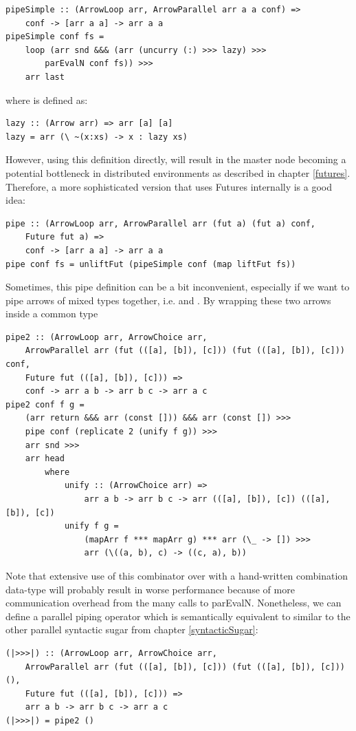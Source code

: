 \begin{lstlisting}[frame=htrbl]
pipeSimple :: (ArrowLoop arr, ArrowParallel arr a a conf) =>
	conf -> [arr a a] -> arr a a
pipeSimple conf fs =
	loop (arr snd &&& (arr (uncurry (:) >>> lazy) >>>
		parEvalN conf fs)) >>>
	arr last
\end{lstlisting}
where  is defined as:
\begin{lstlisting}[frame=htrbl]
lazy :: (Arrow arr) => arr [a] [a]
lazy = arr (\ ~(x:xs) -> x : lazy xs)
\end{lstlisting}
However, using this definition directly, will result in the master node becoming a potential bottleneck in distributed environments as described in chapter \ref{futures}. Therefore, a more sophisticated version that uses Futures internally is a good idea:
\begin{lstlisting}[frame=htrbl]
pipe :: (ArrowLoop arr, ArrowParallel arr (fut a) (fut a) conf,
	Future fut a) =>
	conf -> [arr a a] -> arr a a
pipe conf fs = unliftFut (pipeSimple conf (map liftFut fs))
\end{lstlisting}
Sometimes, this pipe definition can be a bit inconvenient, especially if we want to pipe arrows of mixed types together, i.e.  and . By wrapping these two arrows inside a common type
\begin{lstlisting}[frame=htrbl]
pipe2 :: (ArrowLoop arr, ArrowChoice arr,
	ArrowParallel arr (fut (([a], [b]), [c])) (fut (([a], [b]), [c])) conf,
	Future fut (([a], [b]), [c])) =>
	conf -> arr a b -> arr b c -> arr a c
pipe2 conf f g = 
	(arr return &&& arr (const [])) &&& arr (const []) >>>
	pipe conf (replicate 2 (unify f g)) >>>
	arr snd >>>
	arr head
		where
			unify :: (ArrowChoice arr) =>
				arr a b -> arr b c -> arr (([a], [b]), [c]) (([a], [b]), [c])
			unify f g =
				(mapArr f *** mapArr g) *** arr (\_ -> []) >>>
				arr (\((a, b), c) -> ((c, a), b))
\end{lstlisting}
Note that extensive use of this combinator over  with a hand-written combination data-type will probably result in worse performance because of more communication overhead from the many calls to parEvalN. Nonetheless, we can define a parallel piping operator \code{|>>>|} which is semantically equivalent to \code{>>>} similar to the other parallel syntactic sugar from chapter \ref{syntacticSugar}:
\begin{lstlisting}[frame=htrbl]
(|>>>|) :: (ArrowLoop arr, ArrowChoice arr,
	ArrowParallel arr (fut (([a], [b]), [c])) (fut (([a], [b]), [c])) (),
	Future fut (([a], [b]), [c])) =>
	arr a b -> arr b c -> arr a c
(|>>>|) = pipe2 ()
\end{lstlisting}

